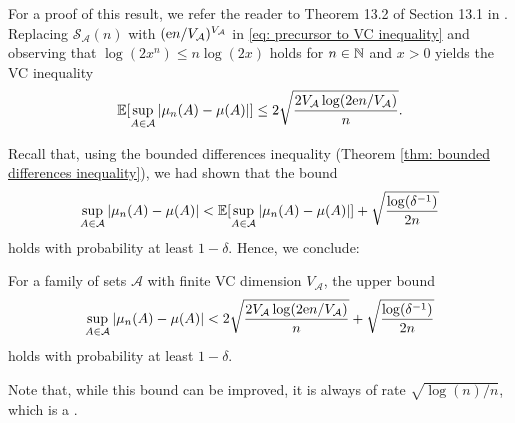For a proof of this result, we refer the reader to Theorem 13.2 of Section 13.1 in \cite[p.~216]{devroye1996probabilistic}. Replacing $\mathcal{S}_{\mathcal{A}}(n)$ with $(\mathrm{e} n / V_{\mathcal{A}})^{V_{\mathcal{A}}}$ in \eqref{eq: precursor to VC inequality} and observing that $\log(2x^n) \leq n \log(2x)$ holds for $n \in \mathbb{N}$ and $x > 0$ yields the VC inequality
\[
    \operatorname{\mathbb{E}}[\sup_{A \in \mathcal{A}} \abs{\mu_n(A) - \mu(A)}] \leq 2 \sqrt{\frac{2 V_{\mathcal{A}} \log(2 \mathrm{e} n / V_{\mathcal{A}})}{n}}.
\]

Recall that, using the bounded differences inequality (Theorem \ref{thm: bounded differences inequality}), we had shown that the bound
\[
    \sup_{A \in \mathcal{A}} \abs{\mu_n(A) - \mu(A)} < \operatorname{\mathbb{E}}[\sup_{A \in \mathcal{A}} \abs{\mu_n(A) - \mu(A)}] + \sqrt{\frac{\log(\delta^{-1})}{2n}}
\]
holds with probability at least $1 - \delta$. Hence, we conclude:

\begin{corollary}[VC Inequality]
For a family of sets $\mathcal{A}$ with finite VC dimension $V_{\mathcal{A}}$, the upper bound
\[
    \sup_{A \in \mathcal{A}} \abs{\mu_n(A) - \mu(A)} < 2 \sqrt{\frac{2 V_{\mathcal{A}} \log(2 \mathrm{e} n / V_{\mathcal{A}})}{n}} + \sqrt{\frac{\log(\delta^{-1})}{2n}}
\]
holds with probability at least $1 - \delta$.
\end{corollary}

Note that, while this bound can be improved, it is always of rate $\sqrt{\log(n) / n}$, which is a .
